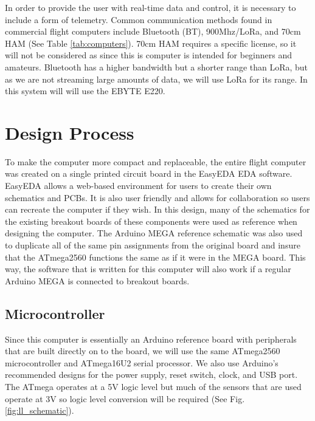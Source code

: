 \documentclass[conf]{new-aiaa}
\begin{document}
 In order to provide the user with real-time data and control, it is necessary to include a form of telemetry. Common communication methods found in commercial flight computers include Bluetooth (BT), 900Mhz/LoRa, and 70cm HAM (See Table \ref{tab:computers}). 70cm HAM requires a specific license\cite{telemegaapogee, telemetrumapogee}, so it will not be considered as since this is computer is intended for beginners and amateurs. Bluetooth has a higher bandwidth but a shorter range than LoRa, but as we are not streaming large amounts of data, we will use LoRa for its range. In this system will will use the EBYTE E220\cite{e220}.

\section{Design Process}
\label{sec:designing}

To make the computer more compact and replaceable, the entire flight computer was created on a single printed circuit board in the EasyEDA EDA software. EasyEDA allows a web-based environment for users to create their own schematics and PCBs. It is also user friendly and allows for collaboration so users can recreate the computer if they wish\cite{easyeda}. In this design, many of the schematics for the existing breakout boards of these components were used as reference when designing the computer. The Arduino MEGA reference schematic was also used to duplicate all of the same pin assignments from the original board and insure that the ATmega2560 functions the same as if it were in the MEGA board. This way, the software that is written for this computer will also work if a regular Arduino MEGA is connected to breakout boards. 

\subsection{Microcontroller}

Since this computer is essentially an Arduino reference board with peripherals that are built directly on to the board, we will use the same ATmega2560 microcontroller and ATmega16U2 serial processor. We also use Arduino's recommended designs for the power supply, reset switch, clock, and USB port\cite{mega}. The ATmega operates at a 5V logic level but much of the sensors that are used operate at 3V so logic level conversion will be required (See Fig. \ref{fig:ll_schematic}).
\end{document}
